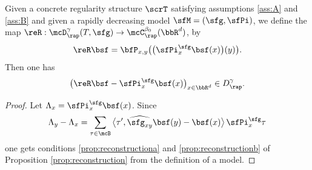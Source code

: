 \begin{cor}\label{canonical reconstruction}
Given a concrete regularity structure $\scrT$ satisfying assumptions \eqref{ass:A} and \eqref{ass:B} and given a rapidly decreasing model $\sfM=(\sfg,\sfPi)$, we define the map \hbox{$\reR : \mcD_\rap^\gamma(T,\sfg)\to \mcC_\rap^{\beta_0}(\bbR^d)$}, by
\[
\reR\bsf = \bfP_{x,y}\bigl(\bigl(\sfPi_x^\sfg\bsf(x)\bigr)(y)\bigr).
\]
Then one has
\[
\bigl(\reR\bsf-\sfPi_x^\sfg\bsf(x)\bigr)_{x\in\bbR^d} \in D_\rap^\gamma.
\]
\end{cor}

\begin{proof}
Let $\Lambda_x=\sfPi_x^\sfg\bsf(x)$. Since
\[
\Lambda_y-\Lambda_x = \sum_{\tau\in\mcB} \big\langle\tau',\widehat{\sfg_{xy}}\bsf(y)-\bsf(x)\big\rangle\,\sfPi_x^\sfg\tau
\]
one gets conditions \eqref{prop:reconstructiona} and \eqref{prop:reconstructionb} of Proposition \ref{prop:reconstruction} from the definition of a model.
\end{proof}

